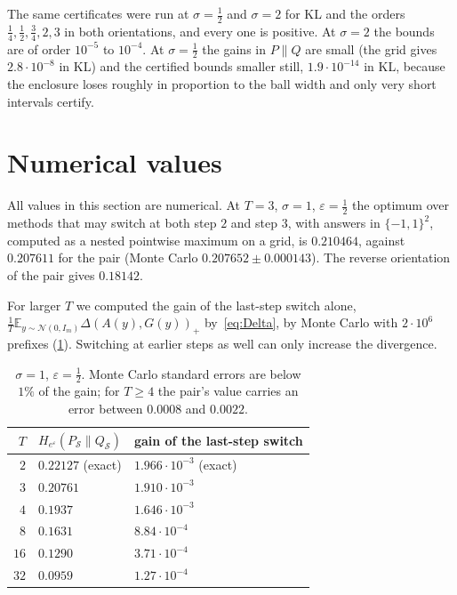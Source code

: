 \documentclass[11pt]{amsart}
\theoremstyle{definition}
\theoremstyle{remark}
\newcommand{\N}{\mathcal N}
\newcommand{\E}{\mathbb E}
\newcommand{\He}{H_{e^{\varepsilon}}}
\begin{document}
The same certificates were run at $\sigma=\frac12$ and $\sigma=2$ for KL and the orders $\frac14,\frac12,\frac34,2,3$ in both orientations, and every one is positive. At $\sigma=2$ the bounds are of order $10^{-5}$ to $10^{-4}$. At $\sigma=\frac12$ the gains in $P\|Q$ are small (the grid gives $2.8\cdot10^{-8}$ in KL) and the certified bounds smaller still, $1.9\cdot10^{-14}$ in KL, because the enclosure loses roughly in proportion to the ball width and only very short intervals certify.

\section{Numerical values}\label{sec:numerics}

All values in this section are numerical. At $T=3$, $\sigma=1$, $\varepsilon=\frac12$ the optimum over methods that may switch at both step $2$ and step $3$, with answers in $\{-1,1\}^2$, computed as a nested pointwise maximum on a grid, is $0.210464$, against $0.207611$ for the pair (Monte Carlo $0.207652\pm0.000143$). The reverse orientation of the pair gives $0.18142$.

For larger $T$ we computed the gain of the last-step switch alone, $\frac1T\E_{y\sim\N(0,I_m)}\Delta(A(y),G(y))_+$ by~\eqref{eq:Delta}, by Monte Carlo with $2\cdot10^6$ prefixes (\cref{tab:T}). Switching at earlier steps as well can only increase the divergence.

\begin{table}[ht]
\centering
\begin{tabular}{rll}
\toprule
$T$ & $\He(P_{\mathcal S}\|Q_{\mathcal S})$ & gain of the last-step switch\\
\midrule
$2$ & $0.22127$ (exact) & $1.966\cdot10^{-3}$ (exact)\\
$3$ & $0.20761$ & $1.910\cdot10^{-3}$\\
$4$ & $0.1937$ & $1.646\cdot10^{-3}$\\
$8$ & $0.1631$ & $8.84\cdot10^{-4}$\\
$16$ & $0.1290$ & $3.71\cdot10^{-4}$\\
$32$ & $0.0959$ & $1.27\cdot10^{-4}$\\
\bottomrule
\end{tabular}
\medskip
\caption{$\sigma=1$, $\varepsilon=\frac12$. Monte Carlo standard errors are below $1\%$ of the gain; for $T\ge4$ the pair's value carries an error between $0.0008$ and $0.0022$.}
\label{tab:T}
\end{table}
\end{document}
